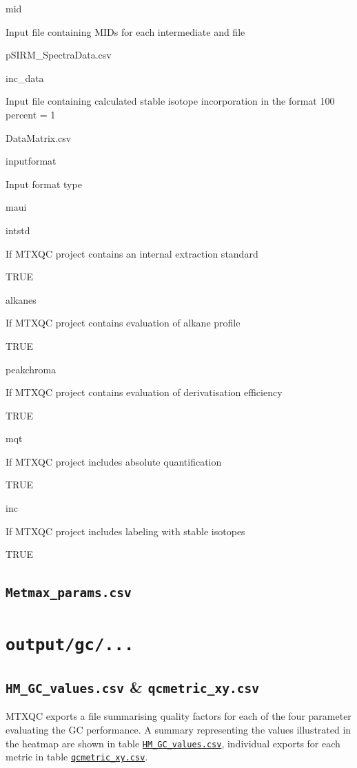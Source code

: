 \documentclass[]{book}
\theoremstyle{definition}
\theoremstyle{definition}
\theoremstyle{definition}
\theoremstyle{remark}
\begin{document}
mid

Input file containing MIDs for each intermediate and file

pSIRM\_SpectraData.csv

inc\_data

Input file containing calculated stable isotope incorporation in the
format 100 percent = 1

DataMatrix.csv

inputformat

Input format type

maui

intstd

If MTXQC project contains an internal extraction standard

TRUE

alkanes

If MTXQC project contains evaluation of alkane profile

TRUE

peakchroma

If MTXQC project contains evaluation of derivatisation efficiency

TRUE

mqt

If MTXQC project includes absolute quantification

TRUE

inc

If MTXQC project includes labeling with stable isotopes

TRUE

\subsection{\texorpdfstring{\texttt{Metmax\_params.csv}}{Metmax\_params.csv}}\label{metmax_params.csv}

\section{\texorpdfstring{\texttt{output/gc/...}}{output/gc/...}}\label{outputgc...}

\subsection{\texorpdfstring{\texttt{HM\_GC\_values.csv} \&
\texttt{qcmetric\_xy.csv}}{HM\_GC\_values.csv \& qcmetric\_xy.csv}}\label{hm_gc_values.csv-qcmetric_xy.csv}

MTXQC exports a file summarising quality factors for each of the four
parameter evaluating the GC performance. A summary representing the
values illustrated in the heatmap are shown in table
\href{@ref(tab:o_hm_gc)}{\texttt{HM\_GC\_values.csv}}, individual
exports for each metric in table
\href{@ref(tab:o_gc_metric)}{\texttt{qcmetric\_xy.csv}}.
\end{document}
